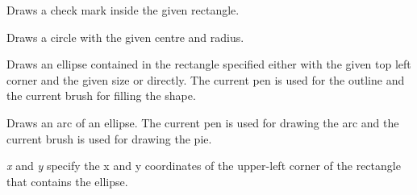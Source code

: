 \label{wxsvgfiledcdrawcheckmark}



Draws a check mark inside the given rectangle.

\label{wxsvgfiledcdrawcircle}



Draws a circle with the given centre and radius.



\label{wxsvgfiledcdrawellipse}




Draws an ellipse contained in the rectangle specified either with the given top
left corner and the given size or directly. The current pen is used for the
outline and the current brush for filling the shape.



\label{wxsvgfiledcdrawellipticarc}


Draws an arc of an ellipse. The current pen is used for drawing the arc and
the current brush is used for drawing the pie.

{\it x} and {\it y} specify the x and y coordinates of the upper-left corner of the rectangle that contains
the ellipse.

